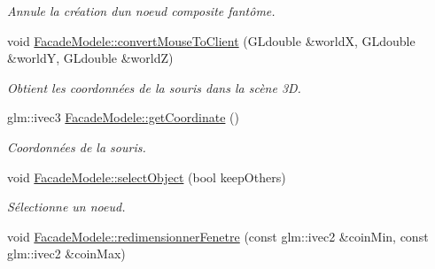 \begin{DoxyCompactItemize}
\begin{DoxyCompactList}\small\item\em Annule la création d\textquotesingle{}un noeud composite fantôme. \end{DoxyCompactList}\item 
void \hyperlink{group__inf2990_ga8ddf1db58d72a811ce50cb830b0fa1c5}{Facade\+Modele\+::convert\+Mouse\+To\+Client} (G\+Ldouble \&world\+X, G\+Ldouble \&world\+Y, G\+Ldouble \&world\+Z)
\begin{DoxyCompactList}\small\item\em Obtient les coordonnées de la souris dans la scène 3\+D. \end{DoxyCompactList}\item 
glm\+::ivec3 \hyperlink{group__inf2990_ga10b1388ade61cff79fb4a96835a77873}{Facade\+Modele\+::get\+Coordinate} ()
\begin{DoxyCompactList}\small\item\em Coordonnées de la souris. \end{DoxyCompactList}\item 
void \hyperlink{group__inf2990_gaa1eea4eb52c6ec22980e0b21e2bdbcd4}{Facade\+Modele\+::select\+Object} (bool keep\+Others)
\begin{DoxyCompactList}\small\item\em Sélectionne un noeud. \end{DoxyCompactList}\item 
\hypertarget{group__inf2990_ga0a03742a7fa2215a6dd6de99cbfd7b05}{}void \hyperlink{group__inf2990_ga0a03742a7fa2215a6dd6de99cbfd7b05}{Facade\+Modele\+::redimensionner\+Fenetre} (const glm\+::ivec2 \&coin\+Min, const glm\+::ivec2 \&coin\+Max)\label{group__inf2990_ga0a03742a7fa2215a6dd6de99cbfd7b05}


\end{DoxyCompactItemize}
